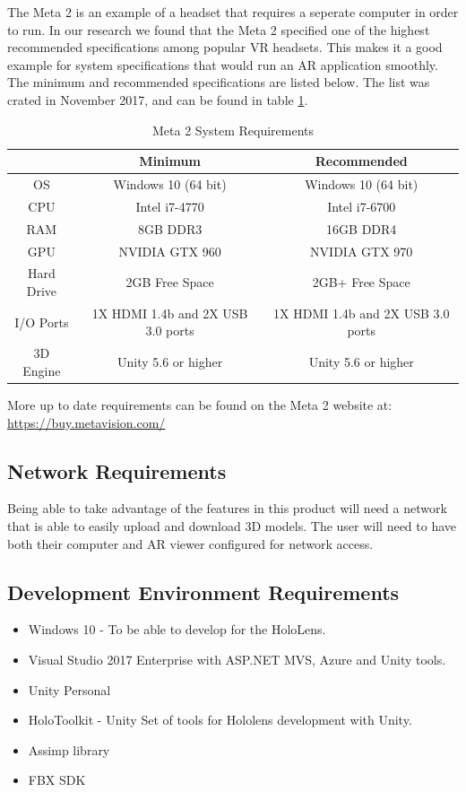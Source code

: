 The Meta 2 is an example of a headset that requires a seperate computer in order
to run.  In our research we found that the Meta 2 specified one of the highest 
recommended specifications among popular VR headsets. This makes it a good 
example for system specifications that would run an AR application smoothly. 
The minimum and recommended specifications are listed below. The list was crated
in November 2017, and can be found in table 
\ref{table:metatwosystemrequirements}.

\begin{table}[H]
	\centering
	\begin{tabular}{ | c | c | c | }
		\hline
		& Minimum & Recommended \\ \hline
		OS & Windows 10 (64 bit) & 	Windows 10 (64 bit) \\ \hline
		CPU & Intel i7-4770 & Intel i7-6700 \\ \hline
		RAM & 8GB DDR3 & 16GB DDR4 \\ \hline
		GPU & NVIDIA GTX 960 & NVIDIA GTX 970 \\ \hline
		Hard Drive & 2GB Free Space & 2GB+ Free Space \\ \hline
		I/O Ports & 1X HDMI 1.4b and 2X USB 3.0 ports & 1X HDMI 1.4b and 2X USB 3.0 ports \\ \hline
		3D Engine & Unity 5.6 or higher & Unity 5.6 or higher \\ \hline
	\end{tabular}

	\caption{Meta 2 System Requirements}
	\label{table:metatwosystemrequirements}
\end{table}

More up to date requirements can be found on the Meta 2 website at: 
\url{https://buy.metavision.com/}

\subsection{Network Requirements}

Being able to take advantage of the features in this product will need a network
that is able to easily upload and download 3D models. The user will need to have
both their computer and AR viewer configured for network access.

\subsection{Development Environment Requirements}
\begin{itemize}
	\item Windows 10 - To be able to develop for the HoloLens.
	\item Visual Studio 2017 Enterprise with ASP.NET MVS, Azure and Unity tools.
	\item Unity Personal
	\item HoloToolkit - Unity Set of tools for Hololens development with Unity.
	\item Assimp library
	\item FBX SDK
\end{itemize}


